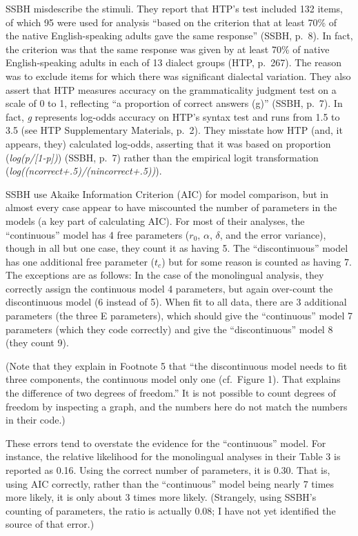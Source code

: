 \documentclass[
  english,
  doc,floatsintext]{apa6}
\begin{document}
\begin{appendix}
SSBH misdescribe the stimuli. They report that HTP's test included 132
items, of which 95 were used for analysis ``based on the criterion that
at least 70\% of the native English-speaking adults gave the same
response'' (SSBH, p.~8). In fact, the criterion was that the same
response was given by at least 70\% of native English-speaking adults in
each of 13 dialect groups (HTP, p.~267). The reason was to exclude items
for which there was significant dialectal variation. They also assert
that HTP measures accuracy on the grammaticality judgment test on a
scale of 0 to 1, reflecting ``a proportion of correct answers (g)''
(SSBH, p.~7). In fact, \emph{g} represents log-odds accuracy on HTP's
syntax test and runs from 1.5 to 3.5 (see HTP Supplementary Materials,
p.~2). They misstate how HTP (and, it appears, they) calculated
log-odds, asserting that it was based on proportion
(\emph{log(p/{[}1-p{]})}) (SSBH, p.~7) rather than the empirical logit
transformation (\emph{log((ncorrect+.5)/(nincorrect+.5))}).

SSBH use Akaike Information Criterion (AIC) for model comparison, but in
almost every case appear to have miscounted the number of parameters in
the models (a key part of calculating AIC). For most of their analyses,
the ``continuous'' model has 4 free parameters (\(r_0\), \(\alpha\),
\(\delta\), and the error variance), though in all but one case, they
count it as having 5. The ``discontinuous'' model has one additional
free parameter (\(t_c\)) but for some reason is counted as having 7. The
exceptions are as follows: In the case of the monolingual analysis, they
correctly assign the continuous model 4 parameters, but again over-count
the discontinuous model (6 instead of 5). When fit to all data, there
are 3 additional parameters (the three E parameters), which should give
the ``continuous'' model 7 parameters (which they code correctly) and
give the ``discontinuous'' model 8 (they count 9).

(Note that they explain in Footnote 5 that ``the discontinuous model
needs to fit three components, the continuous model only one (cf.~Figure
1). That explains the difference of two degrees of freedom.'' It is not
possible to count degrees of freedom by inspecting a graph, and the
numbers here do not match the numbers in their code.)

These errors tend to overstate the evidence for the ``continuous''
model. For instance, the relative likelihood for the monolingual
analyses in their Table 3 is reported as 0.16. Using the correct number
of parameters, it is 0.30. That is, using AIC correctly, rather than the
``continuous'' model being nearly 7 times more likely, it is only about
3 times more likely. (Strangely, using SSBH's counting of parameters,
the ratio is actually 0.08; I have not yet identified the source of that
error.)


\end{appendix}
\end{document}
